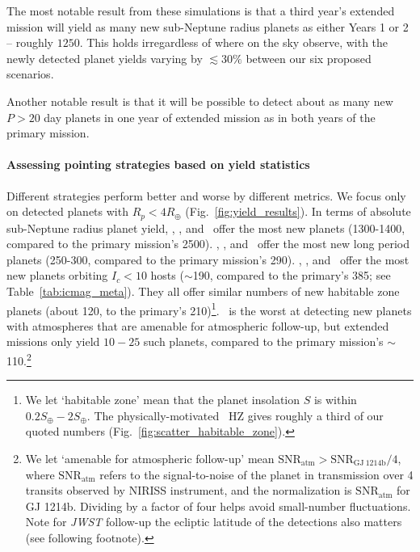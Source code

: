 The most notable result from these simulations is that a third year's extended mission will yield as many new sub-Neptune radius planets as either Years 1 or 2 -- roughly $1250$.
This holds irregardless of where on the sky observe, with the newly detected planet yields varying by $\lesssim 30\%$ between our six proposed scenarios.

Another notable result is that it will be possible to detect about as many new $P>20$ day planets in one year of \tesss extended mission as in both years of the primary mission.

\paragraph{Assessing pointing strategies based on yield statistics} 
Different strategies perform better and worse by different metrics.
We focus only on detected planets with $R_p<4R_\oplus$ (Fig.~\ref{fig:yield_results}).
In terms of absolute sub-Neptune radius planet yield, \hemis, \npole, and \shemiAvoid\ offer the most new planets (1300-1400, compared to the primary mission's 2500).
\hemis, \npole, and \nhemi\ offer the most new long period planets (250-300, compared to the primary mission's 290).
\hemis, \shemiAvoid, and \eshort\ offer the most new planets orbiting $I_c<10$ hosts ($\sim$190, compared to the primary's 385; see Table~\ref{tab:icmag_meta}).
They all offer similar numbers of new habitable zone planets (about 120, to the primary's 210)\footnote{We let `habitable zone' mean that the planet insolation $S$ is within $0.2S_\oplus-2S_\oplus$. The physically-motivated~\protect\citet{kopparapu_habitable_2013} HZ gives roughly a third of our quoted numbers (Fig.~\protect\ref{fig:scatter_habitable_zone}).}.
\npole\ is the worst at detecting new planets with atmospheres that are amenable for atmospheric follow-up, but extended missions only yield $10-25$ such planets, compared to the primary mission's $\sim$110.\footnote{We let `amenable for atmospheric follow-up' mean $\mathrm{SNR}_\mathrm{atm} > \mathrm{SNR}_\mathrm{GJ\ 1214b}/4 $, where $\mathrm{SNR}_\mathrm{atm}$ refers to the signal-to-noise of the planet in transmission over 4 transits observed by \jwsts NIRISS instrument, and the normalization is $\mathrm{SNR}_\mathrm{atm}$ for GJ 1214b. Dividing by a factor of four helps avoid small-number fluctuations. Note for \textit{JWST} follow-up the ecliptic latitude of the detections also matters (see following footnote).}


